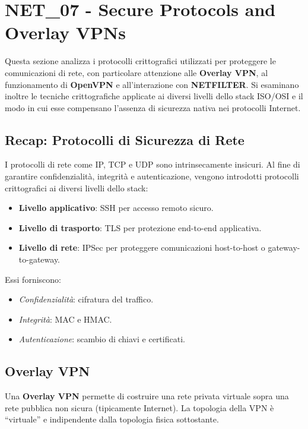\newpage
\section{NET\_07 - Secure Protocols and Overlay VPNs}

Questa sezione analizza i protocolli crittografici utilizzati per proteggere le comunicazioni di rete,
con particolare attenzione alle \textbf{Overlay VPN}, al funzionamento di \textbf{OpenVPN} e
all’interazione con \textbf{NETFILTER}. Si esaminano inoltre le tecniche crittografiche applicate ai
diversi livelli dello stack ISO/OSI e il modo in cui esse compensano l’assenza di sicurezza nativa nei
protocolli Internet.

\subsection{Recap: Protocolli di Sicurezza di Rete}

I protocolli di rete come IP, TCP e UDP sono intrinsecamente insicuri. Al fine di garantire
confidenzialità, integrità e autenticazione, vengono introdotti protocolli crittografici ai diversi livelli
dello stack:

\begin{itemize}
    \item \textbf{Livello applicativo}: SSH per accesso remoto sicuro.
    \item \textbf{Livello di trasporto}: TLS per protezione end-to-end applicativa.
    \item \textbf{Livello di rete}: IPSec per proteggere comunicazioni host-to-host o gateway-to-gateway.
\end{itemize}

Essi forniscono:
\begin{itemize}
    \item \textit{Confidenzialità}: cifratura del traffico.
    \item \textit{Integrità}: MAC e HMAC.
    \item \textit{Autenticazione}: scambio di chiavi e certificati.
\end{itemize}

\subsection{Overlay VPN}

Una \textbf{Overlay VPN} permette di costruire una rete privata virtuale sopra una rete pubblica
non sicura (tipicamente Internet). La topologia della VPN è ``virtuale'' e indipendente dalla
topologia fisica sottostante.

